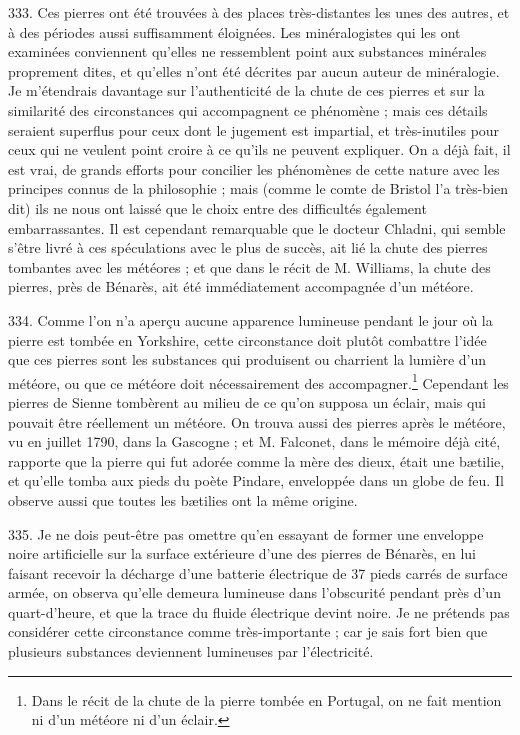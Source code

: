 \documentclass[a4paper, 11pt, oneside, polutonikogreek, french]{article}
\begin{document}
333. Ces pierres ont été trouvées à des places très-distantes les unes des autres, et à des périodes aussi suffisamment éloignées. Les minéralogistes qui les ont examinées conviennent qu'elles ne ressemblent point aux substances minérales proprement dites, et qu'elles n'ont été décrites par aucun auteur de minéralogie. Je m'étendrais davantage sur l'authenticité de la chute de ces pierres et sur la similarité des circonstances qui accompagnent ce phénomène ; mais ces détails seraient superflus pour ceux dont le jugement est impartial, et très-inutiles pour ceux qui ne veulent point croire à ce qu'ils ne peuvent expliquer. On a déjà fait, il est vrai, de grands efforts pour concilier les phénomènes de cette nature avec les principes connus de la philosophie ; mais (comme le comte de Bristol l'a très-bien dit) ils ne nous ont laissé que le choix entre des difficultés également embarrassantes. Il est cependant remarquable que le docteur Chladni, qui semble s'être livré à ces spéculations avec le plus de succès, ait lié la chute des pierres tombantes avec les météores ; et que dans le récit de M. Williams, la chute des pierres, près de Bénarès, ait été immédiatement accompagnée d'un météore.

334. Comme l'on n'a aperçu aucune apparence lumineuse pendant le jour où la pierre est tombée en Yorkshire, cette circonstance doit plutôt combattre l'idée que ces pierres sont les substances qui produisent ou charrient la lumière d'un météore, ou que ce météore doit nécessairement des accompagner.\footnote{Dans le récit de la chute de la pierre tombée en Portugal, on ne fait mention ni d'un météore ni d'un éclair.} Cependant les pierres de Sienne tombèrent au milieu de ce qu'on supposa un éclair, mais qui pouvait être réellement un météore. On trouva aussi des pierres après le météore, vu en juillet 1790, dans la Gascogne ; et M. Falconet, dans le mémoire déjà cité, rapporte que la pierre qui fut adorée comme la mère des dieux, était une bætilie, et qu'elle tomba aux pieds du poète Pindare, enveloppée dans un globe de feu. Il observe aussi que toutes les bætilies ont la même origine.

335. Je ne dois peut-être pas omettre qu'en essayant de former une enveloppe noire artificielle sur la surface extérieure d'une des pierres de Bénarès, en lui faisant recevoir la décharge d'une batterie électrique de 37 pieds carrés de surface armée, on observa qu'elle demeura lumineuse dans l'obscurité pendant près d'un quart-d'heure, et que la trace du fluide électrique devint noire. Je ne prétends pas considérer cette circonstance comme très-importante ; car je sais fort bien que plusieurs substances deviennent lumineuses par l'électricité.
\end{document}
